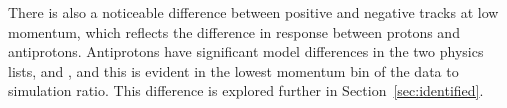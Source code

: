 There is also a noticeable difference between positive and negative tracks at low momentum, which reflects the difference in response between protons and antiprotons.
Antiprotons have significant model differences in the two physics lists, \QGSP and \FTFP, and this is evident in the lowest momentum bin of the data to simulation ratio.
This difference is explored further in Section~\ref{sec:identified}.


\begin{figure}[htbp]
\centering
{}
~
\\
\end{figure}
